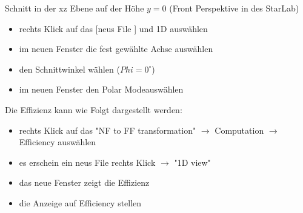 \begin{itemize}
\begin{itemize}
	\end{itemize}
	Schnitt  in der xz Ebene auf der Höhe $y=0$ (Front  Perspektive in des StarLab)
	\begin{itemize}
	\item rechts Klick auf das [neus File ]  und \glqq 1D \grqq auswählen
	\item im neuen Fenster die fest gewählte Achse auswählen 
	\item den Schnittwinkel wählen ($Phi= 0^\circ$)
	\item im neuen Fenster den \glqq Polar Mode\grqq auswählen
	\end{itemize}
	Die Effizienz kann wie Folgt dargestellt werden:
	\begin{itemize}
	\item  rechts Klick auf das "NF to FF transformation"  $\rightarrow$ Computation $\rightarrow$ Efficiency auswählen
	\item es erschein ein neus File rechts Klick  $\rightarrow$ "1D view"
	\item das neue Fenster zeigt die Effizienz 
	\item die Anzeige auf Efficiency stellen
	\end{itemize}
	
\end{itemize}



